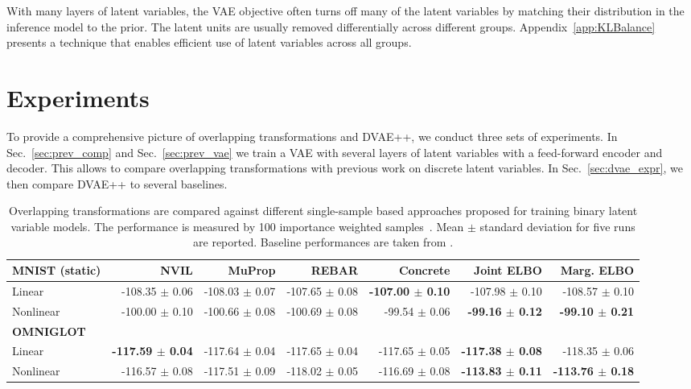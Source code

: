 \documentclass{article}
\begin{document}
With many layers of latent variables, the VAE objective often turns off many of the latent variables by matching 
their distribution in the inference model to the prior. The latent units are usually removed differentially across different groups. 
Appendix~\ref{app:KLBalance} presents a technique that enables efficient use of latent variables across all groups.

\section{Experiments}
To provide a comprehensive picture of overlapping transformations and DVAE++, we conduct three sets of experiments. In Sec.~\ref{sec:prev_comp} and Sec.~\ref{sec:prev_vae}
we train a VAE with several layers of latent variables with a feed-forward encoder and decoder. This allows to compare
overlapping transformations with previous work on discrete latent variables. In Sec.~\ref{sec:dvae_expr}, we then compare DVAE++ to several baselines.

\begin{table*}
\caption{Overlapping transformations are compared against different single-sample based approaches proposed for training binary latent variable models. 
The performance is measured by 100 importance weighted samples~\cite{burda2015importance}. Mean $\pm$ standard deviation for five runs are reported. Baseline performances are taken from \cite{tucker2017rebar}.} \label{tab:res_sbn}
\small
\centering
\begin{tabular}{ l r r r r r r}
\textbf{MNIST (static)}   & NVIL    & MuProp & REBAR &  Concrete & Joint ELBO & Marg. ELBO \\
\hline
Linear       & -108.35 $\pm$ 0.06 & -108.03 $\pm$ 0.07 & -107.65 $\pm$ 0.08 & \textbf{-107.00 $\pmb{\pm}$ 0.10} & -107.98 $\pm$ 0.10 & -108.57 $\pm$ 0.10 \\
Nonlinear    & -100.00 $\pm$ 0.10 & -100.66 $\pm$ 0.08 & -100.69 $\pm$ 0.08 & -99.54 $\pmb{\pm}$ 0.06 & \textbf{-99.16 $\pmb{\pm}$ 0.12} & \textbf{-99.10 $\pmb{\pm}$ 0.21}  \\
\textbf{OMNIGLOT} & &  &  &  &  & \\
\hline
Linear       & \textbf{-117.59 $\pmb{\pm}$ 0.04} & -117.64 $\pm$ 0.04 & -117.65 $\pm$ 0.04 & -117.65 $\pm$ 0.05 & \textbf{-117.38 $\pmb{\pm}$ 0.08}   & -118.35 $\pm$ 0.06 \\
Nonlinear    & -116.57 $\pm$ 0.08 & -117.51 $\pm$ 0.09 & -118.02 $\pm$ 0.05 & -116.69 $\pm$ 0.08 & \textbf{-113.83 $\pmb{\pm}$ 0.11}  & \textbf{-113.76 $\pmb{\pm}$	0.18} \\
\hline
\end{tabular} 
\end{table*}
\end{document}
